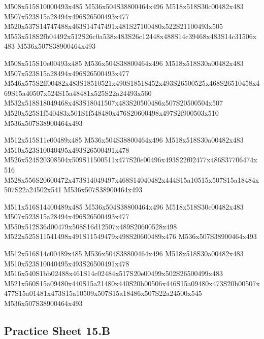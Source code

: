 \documentclass{article}
\begin{document}
\begin{multicols}{5}
\begin{center}

M508x515S10000493x485 %
M536x504S38800464x496 %
M518x518S30c00482x483 %
M507x523S15a28494x496S26500493x477 %
M520x537S14747488x463S14747491x481S27100480x522S21100493x505 %
M553x518S2fb04492x512S26c0a538x483S26c12448x488S14c39468x483S14c31506x483 %
M536x507S38900464x493 %
\vfil
\columnbreak

M508x515S10e00493x485 %
M536x504S38800464x496 %
M518x518S30a00482x483 %
M507x523S15a28494x496S26500493x477 %
M546x575S2ff00482x483S18510521x490S18518452x493S26500525x468S26510458x469S15a40507x524S15a48481x525S22a24493x560 %
M532x518S18049468x483S18041507x483S20500486x507S20500504x507 %
M520x525S1f540483x501S1f548480x476S20600498x497S2f900503x510 %
M536x507S38900464x493 %
\vfil
\columnbreak

M512x515S11e00489x485 %
M536x504S38800464x496 %
M518x518S30a00482x483 %
M510x523S10040495x493S26500491x478 %
M526x524S20308504x509S11500511x477S20e00496x493S22f02477x486S37706474x516 %
M528x556S20600472x473S14049497x468S14040482x444S15a10515x507S15a18484x507S22a24502x541 %
M536x507S38900464x493 %
\vfil
\columnbreak

M511x516S14400489x485 %
M536x504S38800464x496 %
M518x518S30c00482x483 %
M507x523S15a28494x496S26500493x477 %
M550x512S36d00479x508S16d12507x489S20600528x498 %
M522x525S11541498x491S11549479x498S20600489x476 %
M536x507S38900464x493 %
\vfil
\columnbreak

M512x516S14c00489x485 %
M536x504S38800464x496 %
M518x518S30a00482x483 %
M510x523S10040495x493S26500491x478 %
M516x540S1bb02488x461S14c02484x517S20e00499x502S26500499x483 %
M521x560S15a09480x440S15a21480x440S20b00506x446S15a09480x473S20b00507x477S15a01481x473S15a10509x507S15a18486x507S22a24500x545 %
M536x507S38900464x493 %
\vfil

\end{center}
\end{multicols}

\subsection{Practice Sheet 15.B}
\end{document}
